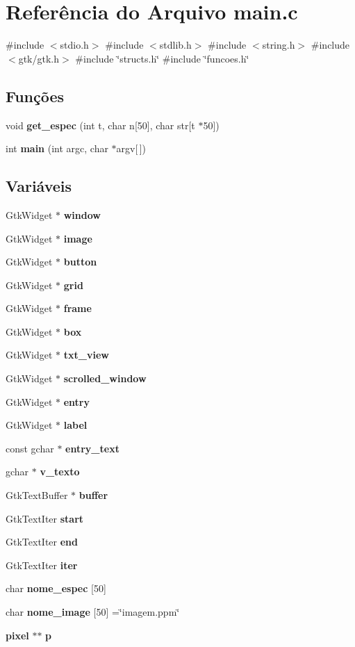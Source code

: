 \section{Referência do Arquivo main.\+c}
\label{main_8c}
{\ttfamily \#include $<$stdio.\+h$>$}\newline
{\ttfamily \#include $<$stdlib.\+h$>$}\newline
{\ttfamily \#include $<$string.\+h$>$}\newline
{\ttfamily \#include $<$gtk/gtk.\+h$>$}\newline
{\ttfamily \#include \char`\"{}structs.\+h\char`\"{}}\newline
{\ttfamily \#include \char`\"{}funcoes.\+h\char`\"{}}\newline
\subsection*{Funções}
\begin{DoxyCompactItemize}
\item 
void \textbf{ get\+\_\+espec} (int t, char n[50], char str[t $\ast$50])
\item 
int \textbf{ main} (int argc, char $\ast$argv[$\,$])
\end{DoxyCompactItemize}
\subsection*{Variáveis}
\begin{DoxyCompactItemize}
\item 
Gtk\+Widget $\ast$ \textbf{ window}
\item 
Gtk\+Widget $\ast$ \textbf{ image}
\item 
Gtk\+Widget $\ast$ \textbf{ button}
\item 
Gtk\+Widget $\ast$ \textbf{ grid}
\item 
Gtk\+Widget $\ast$ \textbf{ frame}
\item 
Gtk\+Widget $\ast$ \textbf{ box}
\item 
Gtk\+Widget $\ast$ \textbf{ txt\+\_\+view}
\item 
Gtk\+Widget $\ast$ \textbf{ scrolled\+\_\+window}
\item 
Gtk\+Widget $\ast$ \textbf{ entry}
\item 
Gtk\+Widget $\ast$ \textbf{ label}
\item 
const gchar $\ast$ \textbf{ entry\+\_\+text}
\item 
gchar $\ast$ \textbf{ v\+\_\+texto}
\item 
Gtk\+Text\+Buffer $\ast$ \textbf{ buffer}
\item 
Gtk\+Text\+Iter \textbf{ start}
\item 
Gtk\+Text\+Iter \textbf{ end}
\item 
Gtk\+Text\+Iter \textbf{ iter}
\item 
char \textbf{ nome\+\_\+espec} [50]
\item 
char \textbf{ nome\+\_\+image} [50] =\char`\"{}imagem.\+ppm\char`\"{}
\item 
\textbf{ pixel} $\ast$$\ast$ \textbf{ p}
\end{DoxyCompactItemize}


